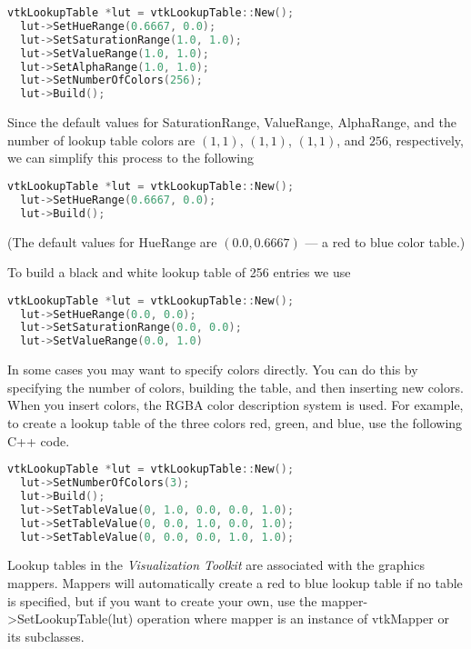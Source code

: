 \begin{lstlisting}[language=C++, caption={Create a rainbow lookup table.}]
vtkLookupTable *lut = vtkLookupTable::New();
  lut->SetHueRange(0.6667, 0.0);
  lut->SetSaturationRange(1.0, 1.0);
  lut->SetValueRange(1.0, 1.0);
  lut->SetAlphaRange(1.0, 1.0);
  lut->SetNumberOfColors(256);
  lut->Build();
\end{lstlisting}

Since the default values for SaturationRange, ValueRange, AlphaRange, and the number of lookup table colors are $(1,1)$, $(1,1)$, $(1,1)$, and $256$, respectively, we can simplify this process to the following

\begin{lstlisting}[language=C++, caption={Create a rainbow lookup table (simplified).}]
vtkLookupTable *lut = vtkLookupTable::New();
  lut->SetHueRange(0.6667, 0.0);
  lut->Build();
\end{lstlisting}

(The default values for HueRange are $(0.0, 0.6667)$ --- a red to blue color table.)

To build a black and white lookup table of 256 entries we use

\begin{lstlisting}[language=C++, caption={Create a black and white lookup table.}]
vtkLookupTable *lut = vtkLookupTable::New();
  lut->SetHueRange(0.0, 0.0);
  lut->SetSaturationRange(0.0, 0.0);
  lut->SetValueRange(0.0, 1.0)
\end{lstlisting}

In some cases you may want to specify colors directly. You can do this by specifying the number of colors, building the table, and then inserting new colors. When you insert colors, the RGBA color description system is used. For example, to create a lookup table of the three colors red, green, and blue, use the following C++ code.

\begin{lstlisting}[language=C++, caption={Directly specifying colors.}]
vtkLookupTable *lut = vtkLookupTable::New();
  lut->SetNumberOfColors(3);
  lut->Build();
  lut->SetTableValue(0, 1.0, 0.0, 0.0, 1.0);
  lut->SetTableValue(0, 0.0, 1.0, 0.0, 1.0);
  lut->SetTableValue(0, 0.0, 0.0, 1.0, 1.0);
\end{lstlisting}

Lookup tables in the \emph{Visualization Toolkit} are associated with the graphics mappers. Mappers will automatically create a red to blue lookup table if no table is specified, but if you want to create your own, use the mapper->SetLookupTable(lut) operation where mapper is an instance of vtkMapper or its subclasses.

